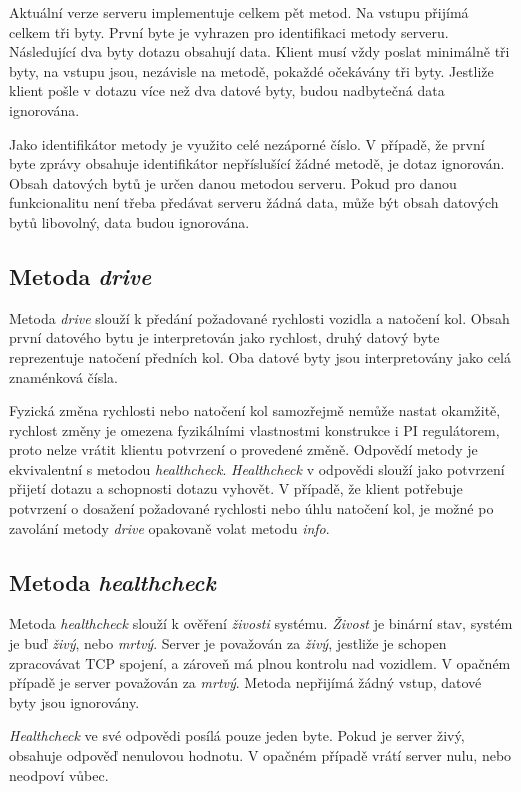 \documentclass[czech, bachelor]{diploma}
\begin{document}
Aktuální verze serveru implementuje celkem pět metod. Na vstupu přijímá celkem tři byty. První byte je vyhrazen pro identifikaci
metody serveru. Následující dva byty dotazu obsahují data. Klient musí vždy poslat minimálně tři byty, na vstupu jsou, nezávisle
na metodě, pokaždé očekávány tři byty. Jestliže klient pošle v dotazu více než dva datové byty, budou nadbytečná data ignorována.

Jako identifikátor metody je využito celé nezáporné číslo. V případě, že první byte zprávy obsahuje identifikátor nepříslušící
žádné metodě, je dotaz ignorován. Obsah datových bytů je určen danou metodou serveru. Pokud pro danou funkcionalitu není třeba
předávat serveru žádná data, může být obsah datových bytů libovolný, data budou ignorována.

\subsection{Metoda \emph{drive}}
Metoda \emph{drive} slouží k předání požadované rychlosti vozidla a natočení kol. Obsah první datového bytu je interpretován jako
rychlost, druhý datový byte reprezentuje natočení předních kol. Oba datové byty jsou interpretovány jako celá znaménková čísla.

Fyzická změna rychlosti nebo natočení kol samozřejmě nemůže nastat okamžitě, rychlost změny je omezena fyzikálními vlastnostmi
konstrukce i PI regulátorem, proto nelze vrátit klientu potvrzení o provedené změně. Odpovědí metody je ekvivalentní s metodou
\emph{healthcheck}. \emph{Healthcheck} v odpovědi slouží jako potvrzení přijetí dotazu a schopnosti dotazu vyhovět. V případě,
že klient potřebuje potvrzení o dosažení požadované rychlosti nebo úhlu natočení kol, je možné po zavolání metody \emph{drive}
opakovaně volat metodu \emph{info}.

\subsection{Metoda \emph{healthcheck}}
Metoda \emph{healthcheck} slouží k ověření \emph{živosti} systému. \emph{Živost} je binární stav, systém je buď \emph{živý}, nebo
\emph{mrtvý}. Server je považován za \emph{živý}, jestliže je schopen zpracovávat TCP spojení, a zároveň má plnou kontrolu
nad vozidlem. V opačném případě je server považován za \emph{mrtvý}. Metoda nepřijímá žádný vstup, datové byty jsou ignorovány.

\emph{Healthcheck} ve své odpovědi posílá pouze jeden byte. Pokud je server živý, obsahuje odpověď nenulovou hodnotu. V opačném
případě vrátí server nulu, nebo neodpoví vůbec.
\end{document}
